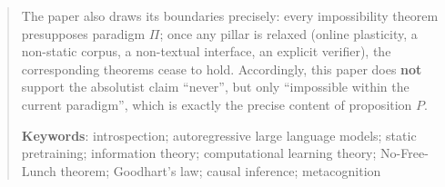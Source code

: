 \documentclass[a4paper]{article}
\theoremstyle{cnplain}
\theoremstyle{cndef}
\begin{document}
\begin{abstract}
\medskip
\noindent The paper also draws its boundaries precisely: every impossibility theorem
presupposes paradigm $\Pi$; once any pillar is relaxed (online plasticity, a non-static
corpus, a non-textual interface, an explicit verifier), the corresponding theorems cease to
hold. Accordingly, this paper does \textbf{not} support the absolutist claim ``never'', but
only ``impossible within the current paradigm'', which is exactly the precise content of
proposition $P$.

\medskip
\noindent\textbf{Keywords}: introspection; autoregressive large language models; static
pretraining; information theory; computational learning theory; No-Free-Lunch theorem;
Goodhart's law; causal inference; metacognition
\end{abstract}

\clearpage










\end{document}
